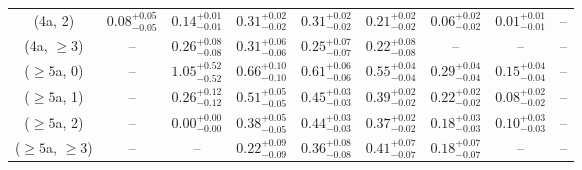 \begin{table}[h!]
{\begin{tabular}{ccccccccc}
	(4a, 2) & $0.08^{+ 0.05 }_{- 0.05 }$ & $0.14^{+ 0.01 }_{- 0.01 }$ & $0.31^{+ 0.02 }_{- 0.02 }$ & $0.31^{+ 0.02 }_{- 0.02 }$ & $0.21^{+ 0.02 }_{- 0.02 }$ & $0.06^{+ 0.02 }_{- 0.02 }$ & $0.01^{+ 0.01 }_{- 0.01 }$ & -- \\[0.5ex] 
	(4a, $\ge3$) & -- & $0.26^{+ 0.08 }_{- 0.08 }$ & $0.31^{+ 0.06 }_{- 0.06 }$ & $0.25^{+ 0.07 }_{- 0.07 }$ & $0.22^{+ 0.08 }_{- 0.08 }$ & -- & -- & -- \\[0.5ex] 
	($\ge5$a, 0) & -- & $1.05^{+ 0.52 }_{- 0.52 }$ & $0.66^{+ 0.10 }_{- 0.10 }$ & $0.61^{+ 0.06 }_{- 0.06 }$ & $0.55^{+ 0.04 }_{- 0.04 }$ & $0.29^{+ 0.04 }_{- 0.04 }$ & $0.15^{+ 0.04 }_{- 0.04 }$ & -- \\[0.5ex] 
	($\ge5$a, 1) & -- & $0.26^{+ 0.12 }_{- 0.12 }$ & $0.51^{+ 0.05 }_{- 0.05 }$ & $0.45^{+ 0.03 }_{- 0.03 }$ & $0.39^{+ 0.02 }_{- 0.02 }$ & $0.22^{+ 0.02 }_{- 0.02 }$ & $0.08^{+ 0.02 }_{- 0.02 }$ & -- \\[0.5ex] 
	($\ge5$a, 2) & -- & $0.00^{+ 0.00 }_{- 0.00 }$ & $0.38^{+ 0.05 }_{- 0.05 }$ & $0.44^{+ 0.03 }_{- 0.03 }$ & $0.37^{+ 0.02 }_{- 0.02 }$ & $0.18^{+ 0.03 }_{- 0.03 }$ & $0.10^{+ 0.03 }_{- 0.03 }$ & -- \\[0.5ex] 
	($\ge5$a, $\ge3$) & -- & -- & $0.22^{+ 0.09 }_{- 0.09 }$ & $0.36^{+ 0.08 }_{- 0.08 }$ & $0.41^{+ 0.07 }_{- 0.07 }$ & $0.18^{+ 0.07 }_{- 0.07 }$ & -- & -- \\[0.5ex] 
	\hline
	\hline
\end{tabular}}
\end{table}
